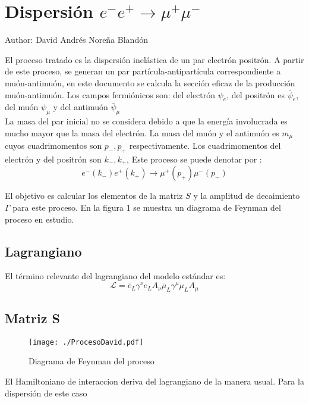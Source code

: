 \chapter{Dispersión $e^{-}e^{+}\longrightarrow \mu^{+}\mu^{-}$}


Author: David Andrés Noreña Blandón

El proceso tratado es la dispersión inelástica de un par electrón positrón. A partir de este proceso, se generan 
un par partícula-antipartícula correspondiente a muón-antimuón, en este documento se calcula la sección eficaz de la producción
muón-antimuón. Los campos fermiónicos son: del electrón $\psi_e$, del positrón es $\bar{\psi}_e$, del muón $\psi_{\mu}$ y del antimuón $\bar{\psi}_{\mu}$ \\
La masa del par inicial no se considera debido a que la energía involucrada es mucho mayor que la masa del electrón. La masa del 
 muón y el antimuón es $m_{\mu}$ cuyos cuadrimomentos son $p_{-}, p_{+}$ respectivamente. Los cuadrimomentos del electrón y del positrón son $k_{-}, k_{+}$, 
Este proceso se puede denotar por :
\[
e^{-}(k_{-})e^{+}(k_{+})\longrightarrow \mu^{+}(p_{+})\mu^{-}(p_{-}) 
\]

El objetivo es calcular los elementos de la matriz $S$ y la amplitud de decaimiento $\Gamma$ para este proceso.
En la figura 1 se muestra un diagrama de Feynman del proceso en estudio.

\section{Lagrangiano}
El término relevante del lagrangiano del modelo estándar es:
\begin{equation}
 \mathcal{L}=\bar{e}_L\gamma^{\nu}e_L A_{\nu}\bar{\mu}_L\gamma^{\mu}\mu_L A_{\mu}
\end{equation}

\section{Matriz S}
\begin{figure}
\begin{center}
\texttt{[image: ./ProcesoDavid.pdf]}
 \caption{Diagrama de Feynman del proceso}
\end{center}
\end{figure}
El Hamiltoniano de interaccion deriva del lagrangiano de la manera usual. Para la dispersión de este caso

